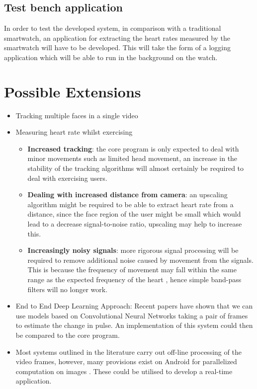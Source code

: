 \subsection*{Test bench application}
In order to test the developed system, in comparison with a traditional smartwatch, an application for extracting the heart rates measured by the smartwatch will have to be developed. This will take the form of a logging application which will be able to run in the background on the watch.

\section*{Possible Extensions}
\begin{itemize}
    \item Tracking multiple faces in a single video
    \item Measuring heart rate whilst exercising
    \begin{itemize}
        \item \textbf{Increased tracking}: the core program is only expected to deal with minor movements such as limited head movement, an increase in the stability of the tracking algorithms will almost certainly be required to deal with exercising users.
        \item \textbf{Dealing with increased distance from camera}: an upscaling algorithm might be required to be able to extract heart rate from a distance, since the face region of the user might be small which would lead to a decrease signal-to-noise ratio, upscaling may help to increase this.
        \item \textbf{Increasingly noisy signals}: more rigorous signal processing will be required to remove additional noise caused by movement from the signals. This is because the frequency of movement may fall within the same range as the expected frequency of the heart \cite{Peng2014}, hence simple band-pass filters will no longer work.
    \end{itemize}
    \item End to End Deep Learning Approach: Recent papers \cite{10.1007/978-3-030-01216-8_22} have shown that we can use models based on Convolutional Neural Networks taking a pair of frames to estimate the change in pulse. An implementation of this system could then be compared to the core program.
    \item Most systems outlined in the literature carry out off-line processing of the video frames, however, many provisions exist on Android for parallelized computation on images \cite{li2018differentiable}. These could be utilised to develop a real-time application.
\end{itemize}

